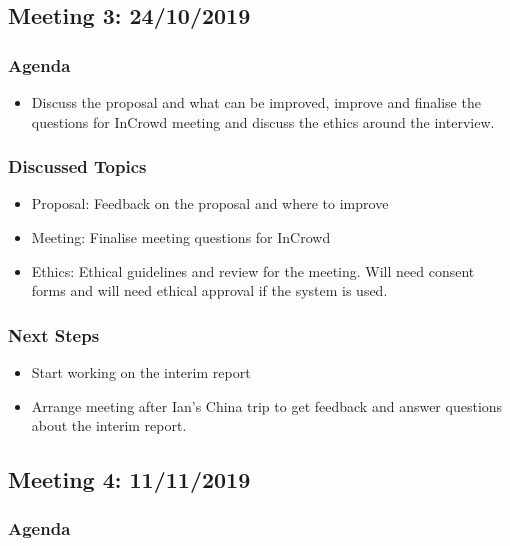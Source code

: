 \documentclass[chapterprefix=false]{scrreprt}
\begin{document}
\subsection{Meeting 3: 24/10/2019}

\subsubsection{Agenda}

\begin{itemize}
 \setlength\itemsep{-0.75em}
 \item Discuss the proposal and what can be improved, improve and finalise the questions for InCrowd meeting and discuss the ethics around the interview.
\end{itemize}


\subsubsection{Discussed Topics}

\begin{itemize}
 \setlength\itemsep{-0.75em}
 \item Proposal: Feedback on the proposal and where to improve
 \item Meeting: Finalise meeting questions for InCrowd
 \item Ethics: Ethical guidelines and review for the meeting. Will need consent forms and will need ethical approval if the system is used.
\end{itemize}

\subsubsection{Next Steps}

\begin{itemize}
 \setlength\itemsep{-0.75em}
 \item Start working on the interim report
 \item Arrange meeting after Ian's China trip to get feedback and answer questions about the interim report.
\end{itemize}

\subsection{Meeting 4: 11/11/2019}

\subsubsection{Agenda}
\end{document}
